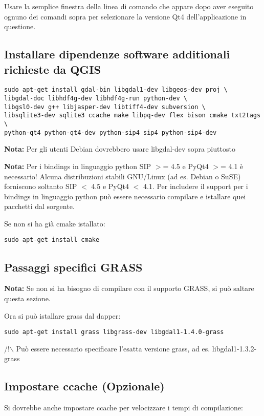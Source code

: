 Usare la semplice finestra della linea di comando che appare dopo aver eseguito ognuno dei comandi sopra per selezionare la versione Qt4 dell'applicazione in questione.

\subsection{Installare dipendenze software additionali richieste da QGIS}
\begin{verbatim}
sudo apt-get install gdal-bin libgdal1-dev libgeos-dev proj \
libgdal-doc libhdf4g-dev libhdf4g-run python-dev \
libgsl0-dev g++ libjasper-dev libtiff4-dev subversion \
libsqlite3-dev sqlite3 ccache make libpq-dev flex bison cmake txt2tags \
python-qt4 python-qt4-dev python-sip4 sip4 python-sip4-dev
\end{verbatim}

\textbf{Nota:} Per gli utenti Debian dovrebbero usare libgdal-dev sopra piuttosto

\textbf{Nota:} Per i bindings in linguaggio python SIP $>$= 4.5 e PyQt4 $>$= 4.1 è necessario! Alcuna distribuzioni stabili GNU/Linux (ad es. Debian o SuSE) forniscono soltanto SIP $<$ 4.5 e PyQt4 $<$ 4.1. Per includere il support per i bindings in linguaggio python può essere necessario compilare e istallare quei pacchetti dal sorgente.

Se non si ha già cmake istallato:

\begin{verbatim}
sudo apt-get install cmake
\end{verbatim}

\subsection{Passaggi specifici GRASS}
\textbf{Nota:} Se non si ha bisogno di compilare con il supporto GRASS, si può saltare questa sezione.

Ora si può istallare grass dal dapper:

\begin{verbatim}
sudo apt-get install grass libgrass-dev libgdal1-1.4.0-grass 
\end{verbatim}

/!$\backslash$ Può essere necessario specificare l'esatta versione grass, ad es. libgdal1-1.3.2-grass

\subsection{Impostare ccache (Opzionale)}
Si dovrebbe anche impostare ccache per velocizzare i tempi di compilazione:

